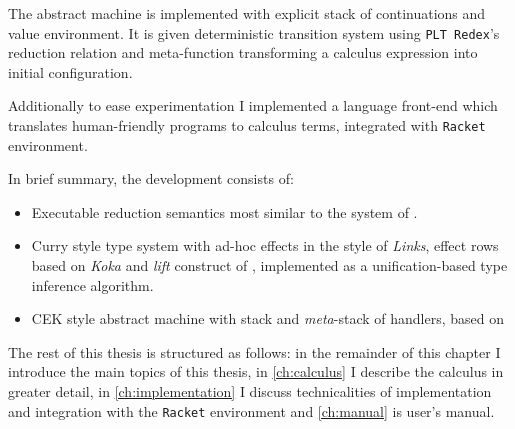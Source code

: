 \documentclass[inz, english, shortabstract]{iithesis}
\newcommand{\Redex}{\texttt{PLT Redex}}
\newcommand{\Racket}{\texttt{Racket}}
\begin{document}
The abstract machine is implemented with explicit stack of continuations and value environment.
It is given deterministic transition system using \Redex{}'s reduction relation and meta-function transforming a calculus expression into initial configuration.

Additionally to ease experimentation I implemented a language front-end which translates human-friendly programs to calculus terms, integrated with \Racket{} environment.

In brief summary, the development consists of:
\begin{itemize}
  \item Executable reduction semantics most similar to the system of \cite{Biernacki2017}.
  \item Curry style type system with ad-hoc effects in the style of \emph{Links}, effect rows based on \emph{Koka} and \emph{lift} construct of \cite{Biernacki2017}, implemented as a unification-based type inference algorithm.
  \item CEK style abstract machine with stack and \emph{meta}-stack of handlers, based on \cite{Hillerstrom2016}
\end{itemize}

The rest of this thesis is structured as follows: in the remainder of this chapter I introduce the main topics of this thesis, in \autoref{ch:calculus} I describe the calculus in greater detail, in \autoref{ch:implementation} I discuss technicalities of implementation and integration with the \Racket{} environment and \autoref{ch:manual} is user's manual.
\end{document}

